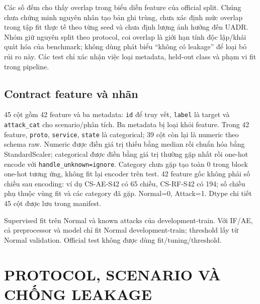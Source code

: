 \documentclass[12pt,a4paper,oneside]{report}
\begin{document}
Các số đếm cho thấy overlap trong biểu diễn feature của official split. Chúng chưa chứng minh nguyên nhân tạo bản ghi trùng, chưa xác định mức overlap trong tập fit thực tế theo từng seed và chưa định lượng ảnh hưởng đến UADR. Nhóm giữ nguyên split theo protocol, coi overlap là giới hạn tính độc lập/khái quát hóa của benchmark; không dùng phát biểu ``không có leakage'' để loại bỏ rủi ro này. Các test chỉ xác nhận việc loại metadata, held-out class và phạm vi fit trong pipeline.

\section{Contract feature và nhãn}
45 cột gồm 42 feature và ba metadata: \texttt{id} để truy vết, \texttt{label} là target và \texttt{attack\_cat} cho scenario/phân tích. Ba metadata bị loại khỏi feature. Trong 42 feature, \texttt{proto}, \texttt{service}, \texttt{state} là categorical; 39 cột còn lại là numeric theo schema raw. Numeric được điền giá trị thiếu bằng median rồi chuẩn hóa bằng StandardScaler; categorical được điền bằng giá trị thường gặp nhất rồi one-hot encode với \texttt{handle\_unknown=ignore}. Category chưa gặp tạo toàn 0 trong block one-hot tương ứng, không fit lại encoder trên test. 42 feature gốc không phải số chiều sau encoding: ví dụ CS-AE-S42 có 65 chiều, CS-RF-S42 có 194; số chiều phụ thuộc vùng fit và các category đã gặp. Normal=0, Attack=1. Dtype chi tiết 45 cột được lưu trong manifest.

Supervised fit trên Normal và known attacks của development-train. Với IF/AE, cả preprocessor và model chỉ fit Normal development-train; threshold lấy từ Normal validation. Official test không được dùng fit/tuning/threshold.


\chapter{PROTOCOL, SCENARIO VÀ CHỐNG LEAKAGE}
\end{document}
